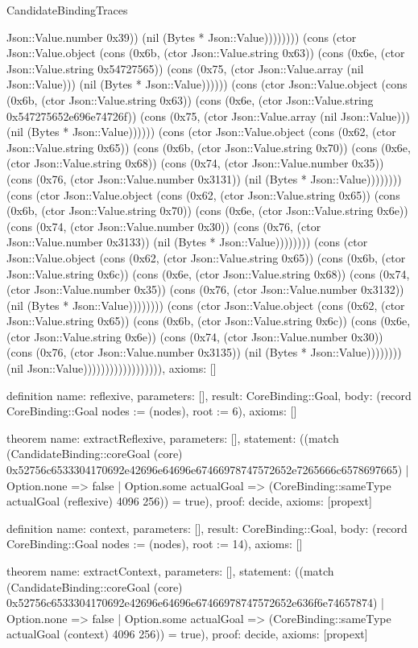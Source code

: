 \begin{lexlean}{CandidateBindingTraces}
\begin{semanticmodule}
{Json::Value.number 0x39)) (nil (Bytes * Json::Value)))))))) (cons (ctor Json::Value.object (cons (0x6b, (ctor Json::Value.string 0x63)) (cons (0x6e, (ctor Json::Value.string 0x54727565)) (cons (0x75, (ctor Json::Value.array (nil Json::Value))) (nil (Bytes * Json::Value)))))) (cons (ctor Json::Value.object (cons (0x6b, (ctor Json::Value.string 0x63)) (cons (0x6e, (ctor Json::Value.string 0x547275652e696e74726f)) (cons (0x75, (ctor Json::Value.array (nil Json::Value))) (nil (Bytes * Json::Value)))))) (cons (ctor Json::Value.object (cons (0x62, (ctor Json::Value.string 0x65)) (cons (0x6b, (ctor Json::Value.string 0x70)) (cons (0x6e, (ctor Json::Value.string 0x68)) (cons (0x74, (ctor Json::Value.number 0x35)) (cons (0x76, (ctor Json::Value.number 0x3131)) (nil (Bytes * Json::Value)))))))) (cons (ctor Json::Value.object (cons (0x62, (ctor Json::Value.string 0x65)) (cons (0x6b, (ctor Json::Value.string 0x70)) (cons (0x6e, (ctor Json::Value.string 0x6e)) (cons (0x74, (ctor Json::Value.number 0x30)) (cons (0x76, (ctor Json::Value.number 0x3133)) (nil (Bytes * Json::Value)))))))) (cons (ctor Json::Value.object (cons (0x62, (ctor Json::Value.string 0x65)) (cons (0x6b, (ctor Json::Value.string 0x6c)) (cons (0x6e, (ctor Json::Value.string 0x68)) (cons (0x74, (ctor Json::Value.number 0x35)) (cons (0x76, (ctor Json::Value.number 0x3132)) (nil (Bytes * Json::Value)))))))) (cons (ctor Json::Value.object (cons (0x62, (ctor Json::Value.string 0x65)) (cons (0x6b, (ctor Json::Value.string 0x6c)) (cons (0x6e, (ctor Json::Value.string 0x6e)) (cons (0x74, (ctor Json::Value.number 0x30)) (cons (0x76, (ctor Json::Value.number 0x3135)) (nil (Bytes * Json::Value)))))))) (nil Json::Value)))))))))))))))))),
 axioms: []
}

definition{
 name: reflexive,
 parameters: [],
 result: CoreBinding::Goal,
 body: (record CoreBinding::Goal {nodes := (nodes), root := 6}),
 axioms: []
}

theorem{
 name: extractReflexive,
 parameters: [],
 statement: ((match (CandidateBinding::coreGoal (core) 0x52756c6533304170692e42696e64696e67466978747572652e7265666c6578697665) | Option.none => false | Option.some actualGoal => (CoreBinding::sameType actualGoal (reflexive) 4096 256)) = true),
 proof: decide{},
 axioms: [propext]
}

definition{
 name: context,
 parameters: [],
 result: CoreBinding::Goal,
 body: (record CoreBinding::Goal {nodes := (nodes), root := 14}),
 axioms: []
}

theorem{
 name: extractContext,
 parameters: [],
 statement: ((match (CandidateBinding::coreGoal (core) 0x52756c6533304170692e42696e64696e67466978747572652e636f6e74657874) | Option.none => false | Option.some actualGoal => (CoreBinding::sameType actualGoal (context) 4096 256)) = true),
 proof: decide{},
 axioms: [propext]
}


\end{semanticmodule}
\end{lexlean}
